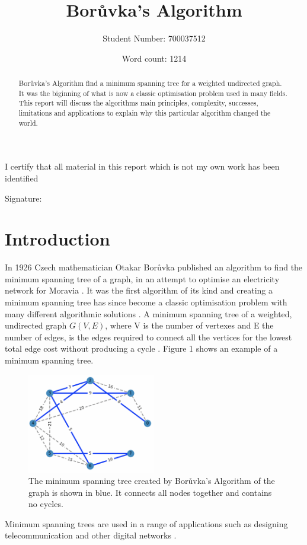 \documentclass[a4paper,11pt]{article}
\title{Borůvka's Algorithm}
\author{Student Number: 700037512}
\date{Word count: 1214}
\begin{document}
\maketitle
\thispagestyle{empty}
\begin{abstract}
\noindent
Borůvka's Algorithm find a minimum spanning tree for a weighted undirected graph. It was the biginning of what is now a classic optimisation problem used in many fields. This report will discuss the algorithms main principles, complexity, successes, limitations and applications to explain why this particular algorithm changed the world.
\end{abstract}

\vspace*{\fill}
\begin{center}
\noindent I certify that all material in this report which is not my own work has been
identified
\end{center}
\vspace{1em}

Signature: \hrulefill
\clearpage
{} 

\newpage
\section{Introduction}
In 1926 Czech mathematician Otakar Borůvka published an algorithm to find the minimum spanning tree of a graph, in an attempt to optimise an electricity network for Moravia \cite{4392963}. It was the first algorithm of its kind and creating a minimum spanning tree has since become a classic optimisation problem with many different algorithmic solutions \cite{nevsetril2012origins}. A minimum spanning tree of a weighted, undirected graph $G(V,E)$, where V is the number of vertexes and E the number of edges, is the edges required to connect all the vertices for the lowest total edge cost without producing a cycle \cite{mst}. Figure 1 shows an example of a minimum spanning tree. 
\begin{figure}[!h]
    \centering
    \includegraphics[width = 0.5\textwidth]{Screenshot 2022-12-07 at 5.26.26 pm.png}
    \caption{The minimum spanning tree created by Borůvka's Algorithm of the graph is shown in blue. It connects all nodes together and contains no cycles.}
    \label{fig:my_label}
\end{figure}
\FloatBarrier
Minimum spanning trees are used in a range of applications such as designing telecommunication and other digital networks \cite{nagarajan2014application}.
\end{document}
